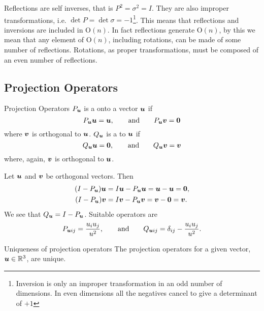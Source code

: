 \documentclass[a4paper]{article}
\newcommand{\orthogonalGroup}{\mathrm{O}}
\begin{document}
    Reflections are self inverses, that is \(P^2 = \sigma^2 = I\).
    They are also improper transformations, i.e. \(\det P = \det\sigma = -1\)\footnote{Inversion is only an improper transformation in an odd number of dimensions. In even dimensions all the negatives cancel to give a determinant of \(+1\)}.
    This means that reflections and inversions are included in \(\orthogonalGroup(n)\).
    In fact reflections generate \(\orthogonalGroup(n)\), by this we mean that any element of \(\orthogonalGroup(n)\), including rotations, can be made of some number of reflections.
    Rotations, as proper transformations, must be composed of an even number of reflections.
    
    \subsection{Projection Operators}
    \begin{definition}{Projection Operators}{}
        \(P_{\bm{u}}\) is a  onto a vector \(\bm{u}\) if
        \[P_{\bm{u}}\bm{u} = \bm{u}, \qquad\text{and}\qquad P_{\bm{u}}\bm{v} = \bm{0}\]
        where \(\bm{v}\) is orthogonal to \(\bm{u}\).
        \(Q_{\bm{u}}\) is a  to \(\bm{u}\) if
        \[Q_{\bm{u}}\bm{u} = \bm{0}, \qquad\text{and}\qquad Q_{\bm{u}}\bm{v} = \bm{v}\]
        where, again, \(\bm{v}\) is orthogonal to \(\bm{u}\).
    \end{definition}
    Let \(\bm{u}\) and \(\bm{v}\) be orthogonal vectors.
    Then
    \begin{align*}
        (I - P_{\bm{u}})\bm{u} &= I\bm{u} - P_{\bm{u}}\bm{u} = \bm{u} - \bm{u} = \bm{0},\\
        (I - P_{\bm{u}})\bm{v} &= I\bm{v} - P_{\bm{u}}\bm{v} = \bm{v} - \bm{0} = \bm{v}.
    \end{align*}
    We see that \(Q_{\bm{u}} = I - P_{\bm{u}}\).
    Suitable operators are
    \[P_{\bm{u}ij} = \frac{u_iu_j}{u^2}, \qquad\text{and}\qquad Q_{\bm{u}ij} = \delta_{ij} - \frac{u_iu_j}{u^2}.\]
    \begin{lemma}{Uniqueness of projection operators}{}
        The projection operators for a given vector, \(\bm{u}\in\mathbb{R}^3\), are unique.
    \end{lemma}
\end{document}
